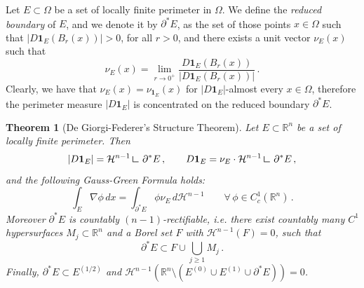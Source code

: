 \documentclass[a4paper,reqno,11pt]{amsart}
\newtheorem{theorem}{Theorem}[section]
\newcommand{\R}{\mathbb{R}}
\newcommand{\ra}{\rightarrow}
\newcommand{\Hau}{{\mathcal H}} %
\newcommand{\de}{\partial}
\newcommand{\ch}{\mathbf{1}}
\newcommand{\restrict}{\mathbin{\vrule height 1.4ex depth 0pt width
		0.13ex\vrule height 0.13ex depth 0pt width 1.3ex}\,}
\begin{document}
Let $E \subset \Omega$ be a set of locally finite perimeter in $\Omega$. We define the \emph{reduced boundary} of $E$, and we denote it by $\de^{\ast} E$, as the set of those points $x \in \Omega$ such that $|D \ch_{E} (B_{r}(x))| > 0$, for all $r > 0$, and there exists a unit vector $\nu_{E}(x)$ such that
\begin{equation*}
\nu_{E}(x) = \lim_{r \ra 0^+} \dfrac{D \ch_{E}(B_{r}(x))}{|D \ch_{E}(B_{r}(x))|} \, .
\end{equation*}
Clearly, we have that $\nu_{E}(x) = \nu_{\ch_{E}}(x)$ for $|D\ch_{E}|$-almost every $x\in \Omega$, therefore the perimeter measure $|D\ch_{E}|$ is concentrated on the reduced boundary $\de^{*}E$. 
\begin{theorem}[De Giorgi-Federer's Structure Theorem] \label{thm:DeGiorgi}
		Let $E \subset \R^{n}$ be a set of locally finite perimeter. Then
		\begin{equation*}
			|D\ch_{E}| = \Hau^{n-1} \restrict \de^{\ast} E \, , \qquad D \ch_{E} = \nu_{E} \cdot \Hau^{n-1} \restrict \de^{\ast} E \, ,
		\end{equation*}
		and the following Gauss-Green Formula holds:
		\begin{equation*}
			\int_{E} \nabla \phi \, dx = \int_{\de^{\ast} E} \phi \nu_{E} \, d \Hau^{n-1} \qquad \forall\, \phi\in C^{1}_{c}(\R^{n})\, .
		\end{equation*}
		Moreover $\de^{\ast} E$ is countably $(n-1)$-rectifiable, i.e. there exist countably many $C^{1}$ hypersurfaces $M_{j} \subset \R^{n}$ and a Borel set $F$ with $\Hau^{n-1}(F) = 0$, such that
		\begin{equation*}
			\de^{\ast} E \subset F \cup \bigcup_{j \geq 1} M_{j} \, .
		\end{equation*}
Finally, $\de^{*}E \subset E^{(1/2)}$ and $\Hau^{n-1}(\R^{n}\setminus(E^{(0)}\cup E^{(1)}\cup \de^{*}E)) = 0$.
\end{theorem}
\end{document}
